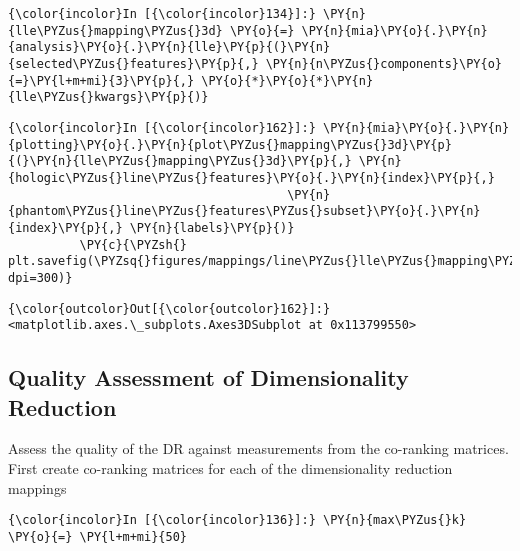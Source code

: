     \begin{Verbatim}[commandchars=\\\{\}]
{\color{incolor}In [{\color{incolor}134}]:} \PY{n}{lle\PYZus{}mapping\PYZus{}3d} \PY{o}{=} \PY{n}{mia}\PY{o}{.}\PY{n}{analysis}\PY{o}{.}\PY{n}{lle}\PY{p}{(}\PY{n}{selected\PYZus{}features}\PY{p}{,} \PY{n}{n\PYZus{}components}\PY{o}{=}\PY{l+m+mi}{3}\PY{p}{,} \PY{o}{*}\PY{o}{*}\PY{n}{lle\PYZus{}kwargs}\PY{p}{)}
\end{Verbatim}

    \begin{Verbatim}[commandchars=\\\{\}]
{\color{incolor}In [{\color{incolor}162}]:} \PY{n}{mia}\PY{o}{.}\PY{n}{plotting}\PY{o}{.}\PY{n}{plot\PYZus{}mapping\PYZus{}3d}\PY{p}{(}\PY{n}{lle\PYZus{}mapping\PYZus{}3d}\PY{p}{,} \PY{n}{hologic\PYZus{}line\PYZus{}features}\PY{o}{.}\PY{n}{index}\PY{p}{,}
                                       \PY{n}{phantom\PYZus{}line\PYZus{}features\PYZus{}subset}\PY{o}{.}\PY{n}{index}\PY{p}{,} \PY{n}{labels}\PY{p}{)}
          \PY{c}{\PYZsh{} plt.savefig(\PYZsq{}figures/mappings/line\PYZus{}lle\PYZus{}mapping\PYZus{}3d.png\PYZsq{}, dpi=300)}
\end{Verbatim}

            \begin{Verbatim}[commandchars=\\\{\}]
{\color{outcolor}Out[{\color{outcolor}162}]:} <matplotlib.axes.\_subplots.Axes3DSubplot at 0x113799550>
\end{Verbatim}

    \subsection{Quality Assessment of Dimensionality
Reduction}\label{quality-assessment-of-dimensionality-reduction}

    Assess the quality of the DR against measurements from the co-ranking
matrices. First create co-ranking matrices for each of the
dimensionality reduction mappings

    \begin{Verbatim}[commandchars=\\\{\}]
{\color{incolor}In [{\color{incolor}136}]:} \PY{n}{max\PYZus{}k} \PY{o}{=} \PY{l+m+mi}{50}
\end{Verbatim}

